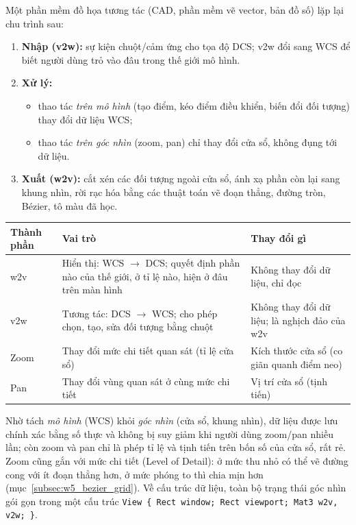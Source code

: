 Một phần mềm đồ họa tương tác (CAD, phần mềm vẽ vector, bản đồ số) lặp lại chu trình sau:
\begin{enumerate}
    \item \textbf{Nhập (v2w):} sự kiện chuột/cảm ứng cho tọa độ DCS; v2w đổi sang WCS để biết người dùng trỏ vào đâu trong thế giới mô hình.
    \item \textbf{Xử lý:}
    \begin{itemize}
        \item thao tác \emph{trên mô hình} (tạo điểm, kéo điểm điều khiển, biến đổi đối tượng) thay đổi dữ liệu WCS;
        \item thao tác \emph{trên góc nhìn} (zoom, pan) chỉ thay đổi cửa sổ, không đụng tới dữ liệu.
    \end{itemize}
    \item \textbf{Xuất (w2v):} cắt xén các đối tượng ngoài cửa sổ, ánh xạ phần còn lại sang khung nhìn, rời rạc hóa bằng các thuật toán vẽ đoạn thẳng, đường tròn, Bézier, tô màu đã học.
\end{enumerate}
\begin{center}
\small
\renewcommand{\arraystretch}{1.25}
\begin{tabularx}{\textwidth}{|p{1.6cm}|X|X|}
\hline
\textbf{Thành phần} & \textbf{Vai trò} & \textbf{Thay đổi gì} \\ \hline
w2v & Hiển thị: WCS $\to$ DCS; quyết định phần nào của thế giới, ở tỉ lệ nào, hiện ở đâu trên màn hình & Không thay đổi dữ liệu, chỉ đọc \\ \hline
v2w & Tương tác: DCS $\to$ WCS; cho phép chọn, tạo, sửa đối tượng bằng chuột & Không thay đổi dữ liệu; là nghịch đảo của w2v \\ \hline
Zoom & Thay đổi mức chi tiết quan sát (tỉ lệ cửa sổ) & Kích thước cửa sổ (co giãn quanh điểm neo) \\ \hline
Pan & Thay đổi vùng quan sát ở cùng mức chi tiết & Vị trí cửa sổ (tịnh tiến) \\ \hline
\end{tabularx}
\end{center}
Nhờ tách \emph{mô hình} (WCS) khỏi \emph{góc nhìn} (cửa sổ, khung nhìn), dữ liệu được lưu chính xác bằng số thực và không bị suy giảm khi người dùng zoom/pan nhiều lần; còn zoom và pan chỉ là phép tỉ lệ và tịnh tiến trên bốn số của cửa sổ, rất rẻ. Zoom cũng gắn với mức chi tiết (Level of Detail): ở mức thu nhỏ có thể vẽ đường cong với ít đoạn thẳng hơn, ở mức phóng to thì chia mịn hơn (mục~\ref{subsec:w5_bezier_grid}). Về cấu trúc dữ liệu, toàn bộ trạng thái góc nhìn gói gọn trong một cấu trúc \texttt{View \{ Rect window; Rect viewport; Mat3 w2v, v2w; \}}.

